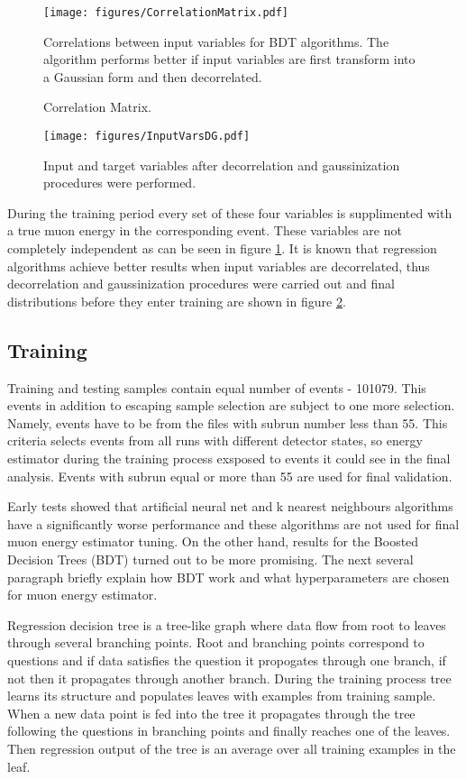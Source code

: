 \begin{figure}[!th]
\centering
\texttt{[image: figures/CorrelationMatrix.pdf]}
\caption{Correlation Matrix.}
{Correlations between input variables for BDT algorithms. The algorithm performs better if input
variables are first transform into a Gaussian form and then decorrelated. }
\label{fig:corrMatrix}
\end{figure}

\begin{figure}[!th]
\centering
\texttt{[image: figures/InputVarsDG.pdf]}
\caption{Input and target variables after decorrelation and gaussinization procedures were performed.}
\label{fig:inputDG}
\end{figure}
During the training period every set of these four variables is supplimented with a true muon
energy in the corresponding event. These variables are not completely independent as 
can be seen in figure \ref{fig:corrMatrix}. It is known that regression algorithms achieve 
better results when input variables are decorrelated, thus decorrelation and gaussinization
procedures were carried out and final distributions before they enter training are shown in figure
\ref{fig:inputDG}.

\subsection{Training}
Training and testing samples contain equal number of events - 101079. This events in addition
to escaping sample selection are subject to one more selection. Namely, events have to be
from the files with subrun number less than 55. This criteria selects events from all
runs with different detector states, so energy estimator during the training process exsposed
to events it could see in the final analysis. Events with subrun equal or more than 55 are used 
for final validation. 

Early tests showed that artificial neural net and k nearest neighbours algorithms have a 
significantly worse performance and these algorithms are not used for final muon energy 
estimator tuning. On the other hand, results for the Boosted Decision Trees (BDT) turned out
to be more promising. The next several paragraph briefly explain how BDT work and what 
hyperparameters are chosen for muon energy estimator.

Regression decision tree is a tree-like graph where data flow from root to leaves through 
several branching points. Root and branching points correspond to questions and if data 
satisfies the question it propogates through one branch, if not then it propagates through
another branch. During the training process tree learns its structure and populates leaves 
with examples from training sample. When a new data point is fed into the tree it propagates
through the tree following the questions in branching points and finally reaches one of the leaves. 
Then regression output of the tree is an average over all training examples in the leaf. 

